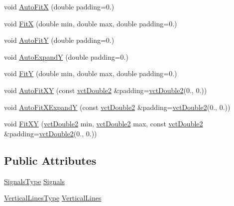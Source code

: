 {\bf }\par
\begin{DoxyCompactItemize}
\item 
void \hyperlink{classvct_plot2_d_base_1_1_scale_ae59a2d3e1f34b425c488308a98744cf6}{Auto\-Fit\-X} (double padding=0.)
\item 
void \hyperlink{classvct_plot2_d_base_1_1_scale_a21172ea983325a8e9234b3766d36af25}{Fit\-X} (double min, double max, double padding=0.)
\item 
void \hyperlink{classvct_plot2_d_base_1_1_scale_aee7ab703d38626e8f9ec1071c291180e}{Auto\-Fit\-Y} (double padding=0.)
\item 
void \hyperlink{classvct_plot2_d_base_1_1_scale_a3e2087e860cd0a3529d99c27fd8d4b52}{Auto\-Expand\-Y} (double padding=0.)
\item 
void \hyperlink{classvct_plot2_d_base_1_1_scale_a1653c8301f2b869b07b862b97c66558f}{Fit\-Y} (double min, double max, double padding=0.)
\item 
void \hyperlink{classvct_plot2_d_base_1_1_scale_ab8fe8d00ed232507fdb75815d34b98bd}{Auto\-Fit\-X\-Y} (const \hyperlink{vct_fixed_size_vector_types_8h_afc0fdcc41cbe8b043747612501610812}{vct\-Double2} \&padding=\hyperlink{vct_fixed_size_vector_types_8h_afc0fdcc41cbe8b043747612501610812}{vct\-Double2}(0., 0.))
\item 
void \hyperlink{classvct_plot2_d_base_1_1_scale_a03dcf9af74b2c77604707595ae00acf8}{Auto\-Fit\-X\-Expand\-Y} (const \hyperlink{vct_fixed_size_vector_types_8h_afc0fdcc41cbe8b043747612501610812}{vct\-Double2} \&padding=\hyperlink{vct_fixed_size_vector_types_8h_afc0fdcc41cbe8b043747612501610812}{vct\-Double2}(0., 0.))
\item 
void \hyperlink{classvct_plot2_d_base_1_1_scale_ac598d8ba71af64d422a46a3dea22bb25}{Fit\-X\-Y} (\hyperlink{vct_fixed_size_vector_types_8h_afc0fdcc41cbe8b043747612501610812}{vct\-Double2} min, \hyperlink{vct_fixed_size_vector_types_8h_afc0fdcc41cbe8b043747612501610812}{vct\-Double2} max, const \hyperlink{vct_fixed_size_vector_types_8h_afc0fdcc41cbe8b043747612501610812}{vct\-Double2} \&padding=\hyperlink{vct_fixed_size_vector_types_8h_afc0fdcc41cbe8b043747612501610812}{vct\-Double2}(0., 0.))
\end{DoxyCompactItemize}

\subsection*{Public Attributes}
\begin{DoxyCompactItemize}
\item 
\hyperlink{classvct_plot2_d_base_1_1_scale_aecdc247557c6ec3b7976596b42a4bc27}{Signals\-Type} \hyperlink{classvct_plot2_d_base_1_1_scale_aaf49bb6b91be117e05da71e7aa19fdc0}{Signals}
\item 
\hyperlink{classvct_plot2_d_base_1_1_scale_acd4d4d528f1381dfd1145ceec34b25ba}{Vertical\-Lines\-Type} \hyperlink{classvct_plot2_d_base_1_1_scale_abf66269635d563e367c3afeba8334053}{Vertical\-Lines}
\end{DoxyCompactItemize}
